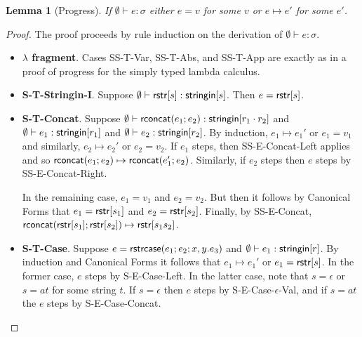 \documentclass[11pt,leqno]{article}
\newtheorem{trlem}[tr]{Lemma}
\theoremstyle{definition}
\newcommand{\val}{{\sf val}}
\newcommand{\stringin}[1]{{\sf stringin}[#1]}
\newcommand{\strcase}[3]{ {\sf rstrcase}(#1; #2; #3)}
\newcommand{\lhead}[1]{ {\sf lhead}(#1) }
\newcommand{\ltail}[1]{ {\sf ltail}(#1) }
\begin{document}
\begin{trlem}[Progress]
If $\emptyset\vdash e : \sigma$ either $e = v$ for some $v$ or $e \mapsto e'$ for some $e'$.
\end{trlem}
\begin{proof}
The proof proceeds by rule induction on the derivation of $\emptyset\vdash e : \sigma$.
\begin{itemize}[label=$ $,itemsep=1ex]
\item \textbf{$\lambda$ fragment}. Cases SS-T-Var, SS-T-Abs, and SS-T-App are exactly as in a proof of progress for
the simply typed lambda calculus.

\item \textbf{S-T-Stringin-I}. Suppose $\emptyset\vdash \rstr{s} : \stringin{s}$.
Then $e={\sf rstr}[s]$.

\item \textbf{S-T-Concat}. Suppose $\emptyset\vdash \rconcat{e_1}{e_2} : \stringin{r_1 \cdot r_2}$ and $\emptyset \vdash e_1 : \stringin{r_1}$ and $\emptyset \vdash e_2 : \stringin{r_2}$.
By induction, $e_1 \mapsto e_1'$ or $e_1 = v_1$ and similarly, $e_2 \mapsto e_2'$ or $e_2 = v_2$. 
If $e_1$ steps, then SS-E-Concat-Left applies and so
${\sf rconcat}(e_1;e_2) \mapsto {\sf rconcat}(e_1';e_2)$. Similarly, if $e_2$ steps
then $e$ steps by SS-E-Concat-Right.

In the remaining case, $e_1 =v_1$ and $e_2 =v_2$.
But then it follows by Canonical Forms that $e_1 = {\sf rstr}[s_1]$
and $e_2 = {\sf rstr}[s_2]$.
Finally, by SS-E-Concat, ${\sf rconcat}({\sf rstr}[s_1];{\sf rstr}[s_2]) \mapsto {\sf rstr}[s_1s_2]$.

\def\mline#1{\par\hspace*{-\leftmargin}\parbox{\textwidth}{\[#1\]}}
\item \textbf{S-T-Case}.
Suppose $e = \strcase{e_1}{e_2}{x,y.e_3}$ and $\emptyset\vdash e_1 : \stringin{r}$.
By induction and Canonical Forms it follows that $e_1 \mapsto e_1'$ or $e_1 = {\sf rstr}[s]$.
In the former case, $e$ steps by S-E-Case-Left.
In the latter case, note that $s = \epsilon$ or $s = at$ for some string $t$.
If $s = \epsilon$ then $e$ steps by S-E-Case-$\epsilon$-Val,
and if $s = at$ the $e$ steps by S-E-Case-Concat.


\end{itemize}
\end{proof}
\end{document}
